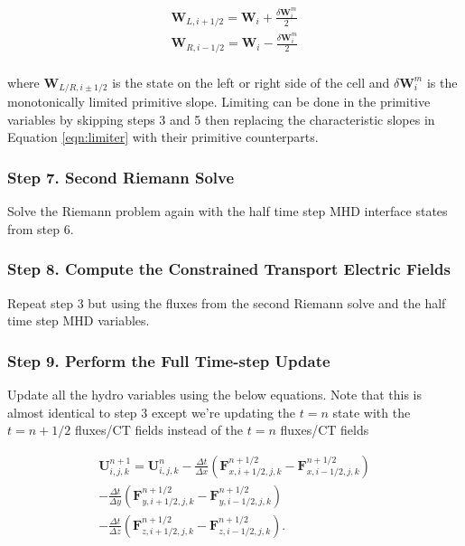     \begin{equation}
        \begin{aligned}
            \boldsymbol{W}_{L, i+1/2} = \boldsymbol{W}_{i} + \frac{\delta \boldsymbol{W}_{i}^m}{2} \\
            \boldsymbol{W}_{R, i-1/2} = \boldsymbol{W}_{i} - \frac{\delta \boldsymbol{W}_{i}^m}{2} \\
        \end{aligned}
    \end{equation}

    where $ \boldsymbol{W}_{L/R, i\pm1/2} $ is the state on the left or right side
    of the cell and $ \delta \boldsymbol{W}_{i}^m $ is the monotonically limited
    primitive slope. Limiting can be done in the primitive variables by skipping steps 3 and 5 then replacing the characteristic slopes in Equation \ref{eqn:limiter} with their primitive counterparts.

\subsubsection{Step 7. Second Riemann Solve}
\label{vlct:2nd-riemann-solve}

Solve the Riemann problem again with the half time step MHD interface states from step 6.

\subsubsection{Step 8. Compute the Constrained Transport Electric Fields}
\label{vlct:2nd-emf}

Repeat step 3 but using the fluxes from the second Riemann solve and the half time step MHD variables.

\subsubsection{Step 9. Perform the Full Time-step Update}
\label{vlct:full-dt-update}

Update all the hydro variables using the below equations. Note that this is almost identical to step 3 except we're updating the $ t = n $ state with the $ t=n+1/2 $ fluxes/CT fields instead of the $ t=n $ fluxes/CT fields

\begin{equation}
    \begin{aligned}
        \boldsymbol{U}^{n+1}_{i,j,k} = \boldsymbol{U}^{n}_{i,j,k}
        - \frac{\Delta t}{\Delta x} \left( \boldsymbol{F}^{n+1/2}_{x,i+1/2,j,k} - \boldsymbol{F}^{n+1/2}_{x,i-1/2,j,k} \right) \\
        - \frac{\Delta t}{\Delta y} \left( \boldsymbol{F}^{n+1/2}_{y,i+1/2,j,k} - \boldsymbol{F}^{n+1/2}_{y,i-1/2,j,k} \right) \\
        - \frac{\Delta t}{\Delta z} \left( \boldsymbol{F}^{n+1/2}_{z,i+1/2,j,k} - \boldsymbol{F}^{n+1/2}_{z,i-1/2,j,k} \right).
    \end{aligned}
\end{equation}

